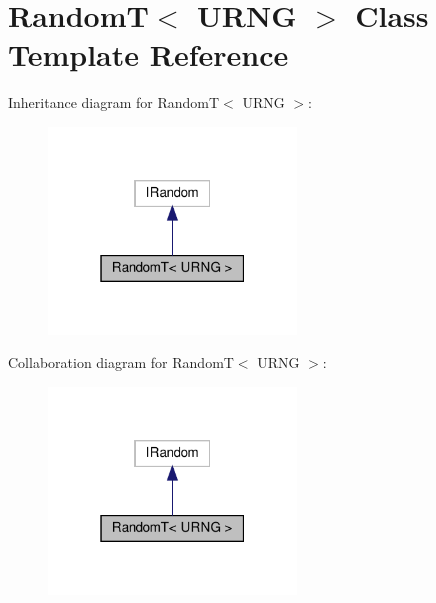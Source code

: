 \hypertarget{class_random_t}{}\section{RandomT$<$ U\+R\+NG $>$ Class Template Reference}
\label{class_random_t}


Inheritance diagram for RandomT$<$ U\+R\+NG $>$\+:
\nopagebreak
\begin{figure}[H]
\begin{center}
\leavevmode
\includegraphics[width=187pt]{class_random_t__inherit__graph}
\end{center}
\end{figure}


Collaboration diagram for RandomT$<$ U\+R\+NG $>$\+:
\nopagebreak
\begin{figure}[H]
\begin{center}
\leavevmode
\includegraphics[width=187pt]{class_random_t__coll__graph}
\end{center}
\end{figure}
